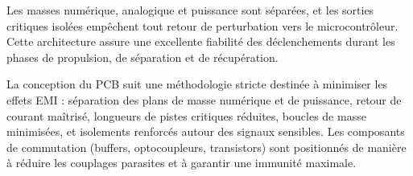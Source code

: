 Les masses numérique, analogique et puissance sont séparées, et les sorties critiques isolées empêchent tout retour de
perturbation vers le microcontrôleur. Cette architecture assure une excellente fiabilité des déclenchements durant les phases
de propulsion, de séparation et de récupération.


La conception du PCB suit une méthodologie stricte destinée à minimiser les effets EMI : séparation des plans de masse numérique
et de puissance, retour de courant maîtrisé, longueurs de pistes critiques réduites, boucles de masse minimisées, et isolements
renforcés autour des signaux sensibles. Les composants de commutation (buffers, optocoupleurs, transistors) sont positionnés de
manière à réduire les couplages parasites et à garantir une immunité maximale.

\newpage